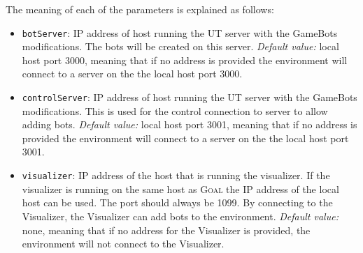 \documentclass[11pt,a4paper]{article}
\newcommand{\Goal}{\textsc{Goal}}
\begin{document}
\noindent The meaning of each of the parameters is explained as follows:
\begin{itemize}


	\item \texttt{botServer}: IP address of host running the UT server with the GameBots modifications. The bots will be created on this server. \textit{Default value:} local host port 3000, meaning that if no address is provided the environment will connect to a server on the the local host port 3000.
	\item \texttt{controlServer}: IP address of host running the UT server with the GameBots modifications. This is used for the control connection to server to allow adding bots. \textit{Default value:} local host port 3001, meaning that if no address is provided the environment will connect to a server on the the local host port 3001.
	\item \texttt{visualizer}: IP address of the host that is running the visualizer. If the visualizer is running on the same host as {\Goal} the IP address of the local host can be used. The port should always be 1099. By connecting to the Visualizer, the Visualizer can add bots to the environment. \textit{Default value:} none, meaning that if no address for the Visualizer is provided, the environment will not connect to the Visualizer.


\end{itemize}
\end{document}
